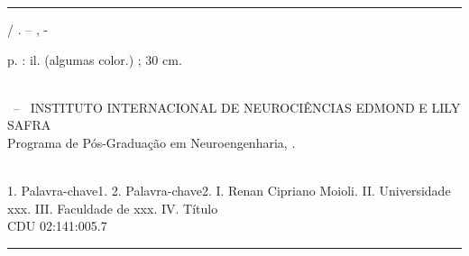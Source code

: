 

    \begin{fichacatalografica}
    	\vspace*{\fill}					%
    	\hrule							%
    	\begin{center}					%
        	\begin{minipage}[c]{12.5cm}		%
        	
            	\imprimirautor
            	
            	\hspace{0.5cm} \imprimirtitulo  / \imprimirautor. --
            	\imprimirlocal, \imprimirdata-
            	
            	\hspace{0.5cm} \pageref{LastPage} p. : il. (algumas color.) ; 30 cm.\\
            	
            	\hspace{0.5cm} \imprimirorientadorRotulo~\imprimirorientador\\
            	\hspace{0.5cm}
            	\parbox[t]{\textwidth}{\imprimirtipotrabalho~--~ INSTITUTO INTERNACIONAL DE NEUROCIÊNCIAS EDMOND E LILY SAFRA \\ Programa de Pós-Graduação em Neuroengenharia,
            	\imprimirdata.}\\
            	
            	\hspace{0.5cm}
            		1. Palavra-chave1.
            		2. Palavra-chave2.
            		I. Renan Cipriano Moioli.
            		II. Universidade xxx.
            		III. Faculdade de xxx.
            		IV. Título\\ 			
            	
            	\hspace{8.75cm} CDU 02:141:005.7\\
        	
        	\end{minipage}
    	\end{center}
    	\hrule
    \end{fichacatalografica}
    \setcounter{page}{3}